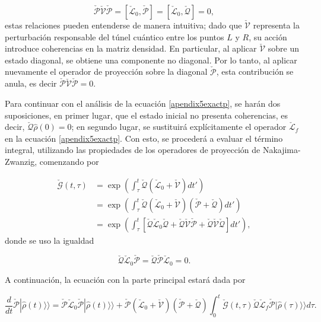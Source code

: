 \begin{appendixs}
\begin{equation*}
    \check{\mathcal{P}}\check{\mathcal{V}}\check{\mathcal{P}} = [\check{\mathcal{L}}_0,\check{\mathcal{P}}] = [\check{\mathcal{L}}_0,\check{\mathcal{Q}}] = 0, 
\end{equation*}
estas relaciones pueden entenderse de manera intuitiva; dado que $\check{\mathcal{V}}$ representa la perturbación responsable del túnel cuántico entre los puntos $L$ y $R$, su acción introduce coherencias en la matriz densidad. En particular, al aplicar $\check{\mathcal{V}}$ sobre un estado diagonal, se obtiene una componente no diagonal. Por lo tanto, al aplicar nuevamente el operador de proyección sobre la diagonal $\check{\mathcal{P}}$, esta contribución se anula, es decir $\check{\mathcal{P}} \check{\mathcal{V}} \check{\mathcal{P}} = 0$.

Para continuar con el análisis de la ecuación \ref{apendix5exactp}, se harán dos suposiciones, en primer lugar, que el estado inicial no presenta coherencias, es decir, $\check{\mathcal{Q}}\hat{\rho}(0) = 0$; en segundo lugar, se sustituirá explícitamente el operador $\check{\mathcal{L}}_f$ en la ecuación \ref{apendix5exactp}. Con esto, se procederá a evaluar el término integral, utilizando las propiedades de los operadores de proyección de Nakajima-Zwanzig, comenzando por

\begin{align*}
    \check{\mathcal{G}}(t,\tau) & = \exp\left(  \int_{\tau}^{t}\check{\mathcal{Q}}(\check{\mathcal{L}}_{0} + \check{\mathcal{V}})dt' \right) \\
        & = \exp\left(  \int_{\tau}^{t}\check{\mathcal{Q}}(\check{\mathcal{L}}_{0}+\check{\mathcal{V}})(\check{\mathcal{P}}+\check{\mathcal{Q}}) dt' \right) \\
            & = \exp\left(  \int_{\tau}^{t}\left[\check{\mathcal{Q}}\check{\mathcal{L}}_{0}\check{\mathcal{Q}}+ \check{\mathcal{Q}}\check{\mathcal{V}}\check{\mathcal{P}}+\check{\mathcal{Q}}\check{\mathcal{V}}\check{\mathcal{Q}}\right] dt' \right),       
\end{align*}
donde se uso la igualdad

\begin{equation*}
    \check{\mathcal{Q}}\check{\mathcal{L}}_{0}\check{\mathcal{P}} = \check{\mathcal{Q}}\check{\mathcal{P}}\check{\mathcal{L}}_{0}= 0.
\end{equation*}

A continuación, la ecuación con la parte principal estará dada por 

\begin{equation*}
    \frac{d}{dt}\check{\mathcal{P}}|\hat{\rho}(t)\rangle \rangle = \check{\mathcal{P}}\check{\mathcal{L}}_{0}\check{\mathcal{P}}|\hat{\rho}(t)\rangle \rangle + \check{\mathcal{P}}(\check{\mathcal{L}}_{0} + \check{\mathcal{V}})(\check{\mathcal{P}}+\check{\mathcal{Q}})\int_{0}^{t}\check{\mathcal{G}}(t,\tau)\check{\mathcal{Q}}\check{\mathcal{L}}_{f} \check{\mathcal{P}}|\hat{\rho}(\tau)\rangle \rangle d\tau.       
\end{equation*}


\end{appendixs}
